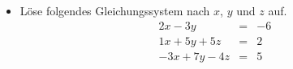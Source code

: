 \documentclass[a4paper,12pt]{article}
\begin{document}
\newpage
{}
\begin{itemize}
	\item[a)] Löse folgendes Gleichungssystem nach $x$, $y$ und $z$ auf.
	\begin{eqnarray*}
        2x-3y & = & -6\\
        1x+5y+5z & = & 2\\
        -3x+7y-4z & = & 5 
    \end{eqnarray*}
	
\end{itemize}
\end{document}
